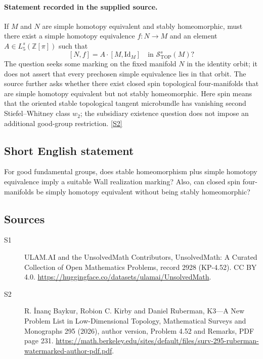 \documentclass[11pt]{article}
\newcommand{\sref}[2]{\hyperlink{source:#1:#2}{[S#2]}}
\begin{document}
\paragraph{Statement recorded in the supplied source.}
If $M$ and $N$ are simple homotopy equivalent and stably homeomorphic, must there exist a simple homotopy equivalence $f:N\to M$ and an element $A\in L_5^s(\mathbb Z[\pi])$ such that
\[
[N,f]=A\cdot[M,\mathrm{Id}_M]\quad\text{in }\mathcal S^s_{\mathrm{TOP}}(M)?
\]
The question seeks some marking on the fixed manifold $N$ in the identity orbit; it does not assert that every prechosen simple equivalence lies in that orbit. The source further asks whether there exist closed spin topological four-manifolds that are simple homotopy equivalent but not stably homeomorphic. Here spin means that the oriented stable topological tangent microbundle has vanishing second Stiefel--Whitney class $w_2$; the subsidiary existence question does not impose an additional good-group restriction. \sref{2928}{2}
\subsection{Short English statement}
For good fundamental groups, does stable homeomorphism plus simple homotopy equivalence imply a suitable Wall realization marking? Also, can closed spin four-manifolds be simply homotopy equivalent without being stably homeomorphic?
\subsection{Sources}
\begin{description}
\item[\hypertarget{source:2928:1}{S1}] ULAM.AI and the UnsolvedMath Contributors, UnsolvedMath: A Curated Collection of Open Mathematics Problems, record 2928 (KP-4.52). CC BY 4.0. \url{https://huggingface.co/datasets/ulamai/UnsolvedMath}.
\item[\hypertarget{source:2928:2}{S2}] R. İnanç Baykur, Robion C. Kirby and Daniel Ruberman, K3—A New Problem List in Low-Dimensional Topology, Mathematical Surveys and Monographs 295 (2026), author version, Problem 4.52 and Remarks, PDF page 231. \url{https://math.berkeley.edu/sites/default/files/surv-295-ruberman-watermarked-author-pdf.pdf}.
\end{description}
\label{end:2928}
\end{document}
